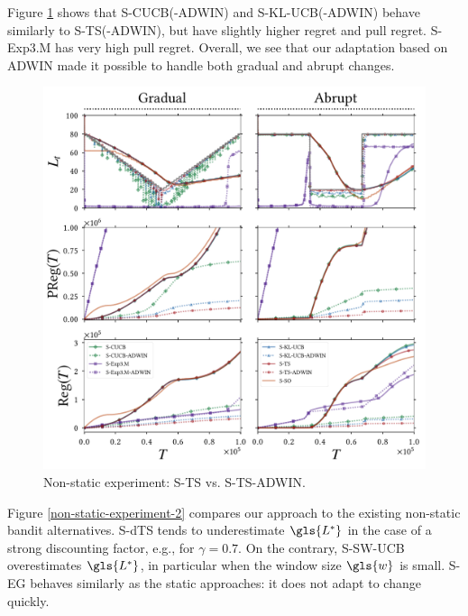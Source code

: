 Figure \ref{non-static-experiment-1} shows that S-\gls{CUCB}(-\gls{ADWIN}) and \gls{S-KL-UCB}(-\gls{ADWIN}) behave similarly to \gls{S-TS}(-\gls{ADWIN}), but have slightly higher regret and pull regret. S-\gls{Exp3.M} has very high pull regret. 
Overall, we see that our adaptation based on \gls{ADWIN} made it possible to handle both gradual and abrupt changes.

\begin{figure}[ht]
	\centering
		\includegraphics[width=0.9\linewidth, trim=0cm 0cm 0cm 0.5cm]{part3-figures/gradual_abrupt_regret_small-2-compressed.pdf}
	\caption{Non-static experiment: \acrshort{S-TS} vs. \acrshort{S-TS-ADWIN}.} 
	\label{non-static-experiment-1}
\end{figure}

Figure \ref{non-static-experiment-2} compares our approach to the existing non-static bandit alternatives. S-\gls{dTS} tends to underestimate $\gls{L^*}$ in the case of a strong discounting factor, e.g., for $\gamma = 0.7$. 
On the contrary, S-\gls{SW-UCB} overestimates $\gls{L^*}$, in particular when the window size $\gls{w}$ is small. \textsc{S-\gls{EG}} behaves similarly as the static approaches: it does not adapt to change quickly. 

